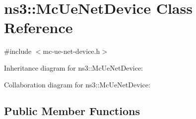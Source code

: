 \hypertarget{classns3_1_1McUeNetDevice}{}\section{ns3\+:\+:Mc\+Ue\+Net\+Device Class Reference}
\label{classns3_1_1McUeNetDevice}


{\ttfamily \#include $<$mc-\/ue-\/net-\/device.\+h$>$}



Inheritance diagram for ns3\+:\+:Mc\+Ue\+Net\+Device\+:


Collaboration diagram for ns3\+:\+:Mc\+Ue\+Net\+Device\+:
\subsection*{Public Member Functions}
